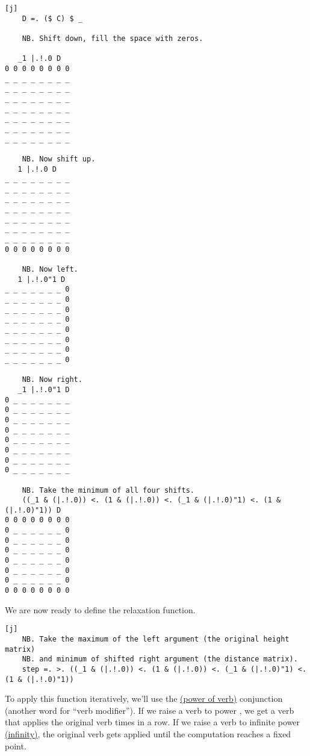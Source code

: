 \documentclass{article}
\begin{document}
\begin{verbatim}[j]
    D =. ($ C) $ _

    NB. Shift down, fill the space with zeros.

   _1 |.!.0 D
0 0 0 0 0 0 0 0
_ _ _ _ _ _ _ _
_ _ _ _ _ _ _ _
_ _ _ _ _ _ _ _
_ _ _ _ _ _ _ _
_ _ _ _ _ _ _ _
_ _ _ _ _ _ _ _
_ _ _ _ _ _ _ _

    NB. Now shift up.
   1 |.!.0 D
_ _ _ _ _ _ _ _
_ _ _ _ _ _ _ _
_ _ _ _ _ _ _ _
_ _ _ _ _ _ _ _
_ _ _ _ _ _ _ _
_ _ _ _ _ _ _ _
_ _ _ _ _ _ _ _
0 0 0 0 0 0 0 0

    NB. Now left.
   1 |.!.0"1 D
_ _ _ _ _ _ _ 0
_ _ _ _ _ _ _ 0
_ _ _ _ _ _ _ 0
_ _ _ _ _ _ _ 0
_ _ _ _ _ _ _ 0
_ _ _ _ _ _ _ 0
_ _ _ _ _ _ _ 0
_ _ _ _ _ _ _ 0

    NB. Now right.
   _1 |.!.0"1 D
0 _ _ _ _ _ _ _
0 _ _ _ _ _ _ _
0 _ _ _ _ _ _ _
0 _ _ _ _ _ _ _
0 _ _ _ _ _ _ _
0 _ _ _ _ _ _ _
0 _ _ _ _ _ _ _
0 _ _ _ _ _ _ _

    NB. Take the minimum of all four shifts.
    ((_1 & (|.!.0)) <. (1 & (|.!.0)) <. (_1 & (|.!.0)"1) <. (1 & (|.!.0)"1)) D
0 0 0 0 0 0 0 0
0 _ _ _ _ _ _ 0
0 _ _ _ _ _ _ 0
0 _ _ _ _ _ _ 0
0 _ _ _ _ _ _ 0
0 _ _ _ _ _ _ 0
0 _ _ _ _ _ _ 0
0 0 0 0 0 0 0 0
\end{verbatim}

We are now ready to define the relaxation function.

\begin{verbatim}[j]
    NB. Take the maximum of the left argument (the original height matrix)
    NB. and minimum of shifted right argument (the distance matrix).
    step =. >. ((_1 & (|.!.0)) <. (1 & (|.!.0)) <. (_1 & (|.!.0)"1) <. (1 & (|.!.0)"1))
\end{verbatim}

To apply this function iteratively, we'll use the \href{https://code.jsoftware.com/wiki/Vocabulary/hatco}{\code{^:} (power of verb)} conjunction (another  word for ``verb modifier'').
If we raise a verb to power , we get a verb that applies the original verb  times in a row.
If we raise a verb to infinite power \href{https://code.jsoftware.com/wiki/Vocabulary/under}{\code{_} (infinity)}, the original verb gets applied until the computation reaches a fixed point.
\end{document}
